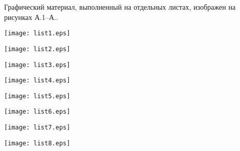 
Графический материал, выполненный на отдельных листах,
изображен на рисунках А.1--А..
\setcounter{числоПлакатов}{0}

\renewcommand{\thefigure}{А.\arabic{figure}} %

\begin{landscape}

\begin{плакат}
	\texttt{[image: list1.eps]}
	\label{pl1:image}      
\end{плакат}

\begin{плакат}
	\texttt{[image: list2.eps]}
	\label{pl2:image}      
\end{плакат}

\begin{плакат}
	\texttt{[image: list3.eps]}
	\label{pl3:image}      
\end{плакат}

\begin{плакат}
	\texttt{[image: list4.eps]}
	\label{pl4:image}      
\end{плакат}

\begin{плакат}
	\texttt{[image: list5.eps]}
	\label{pl5:image}      
\end{плакат}

\begin{плакат}
	\texttt{[image: list6.eps]}
	\label{pl6:image}      
\end{плакат}

\begin{плакат}
	\texttt{[image: list7.eps]}
	\label{pl7:image}      
\end{плакат}

\begin{плакат}
	\texttt{[image: list8.eps]}
	\label{pl8:image}      
\end{плакат}


\end{landscape}
